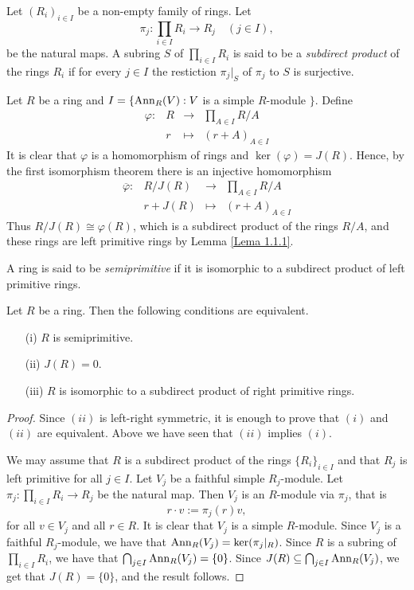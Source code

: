 \begin{definition}
    Let $( R_i) _{i\in I}$ be a non-empty family of rings. Let
    \[
    \pi_j\colon\prod_{i\in I}R_i\rightarrow R_j\quad (j\in I),
    \]
    be the natural maps. A subring $S$ of $\prod_{i\in I}R_i$ is said to be a \emph{subdirect product} 
    of the rings $R_i$ if for every $j\in I$ the restiction $\pi_j|_S$ of $\pi_j$ to $S$ is surjective.
\end{definition}

Let $R$ be a ring and $I=\{ \operatorname{Ann}_R(V) : V$ is a simple $R$-module $\}$. Define
\[
\begin{array}{cccc}\varphi\colon &R&\rightarrow &\prod_{A\in I}R/A\\
&r&\mapsto &(r+A)_{A\in I}\end{array}
\]
It is clear that $\varphi$ is a homomorphism of rings and $\ker(\varphi
)=J(R)$. Hence, by the first isomorphism theorem there is an injective homomorphism
\[
\begin{array}{cccc}\overline{\varphi}\colon &R/J(R)&\rightarrow &\prod_{A\in I}R/A\\
&r+J(R)&\mapsto &(r+A)_{A\in I}\end{array}
\]
Thus $R/J(R)\cong \varphi (R)$, which is a subdirect product of the rings $R/A$, and these rings are left primitive rings by Lemma \ref{Lema 1.1.1}. 

\begin{definition}
A ring is said to be \emph{semiprimitive} if it is isomorphic to a subdirect product of left primitive rings.
\end{definition}

\begin{proposition}\label{Prop1.3.2}
Let $R$ be a ring. Then the following conditions are equivalent.
\begin{itemize}\item[(i)] $R$ is semiprimitive.
\item[(ii)] $J(R)=0$.
\item[(iii)] $R$ is isomorphic to a subdirect product of right primitive rings.
\end{itemize}
\end{proposition}

\begin{proof}
Since $(ii)$ is left-right symmetric, it is enough to prove that  $(i)$ and
$(ii)$ are equivalent. Above we have seen that $(ii)$ implies $(i)$. 

We may assume that $R$ is a subdirect product of the rings $\{ R_i\} _{i\in I}$
and that $R_j$ is left primitive for all $j\in I$. Let $V_j$ be a faithful simple $R_j$-module. 
Let $\pi _j\colon\prod_{i\in I}R_i\rightarrow R_j$ be the natural map. Then $V_j$ is an $R$-module via $\pi _j$,
that is
$$r\cdot v:=\pi_j(r)v,$$
for all $v\in V_j$ and all $r\in R$.
It is clear that $V_j$ is a simple $R$-module. Since $V_j$ is a faithful $R_j$-module, we have that
$\operatorname{Ann}_R(V_j)=\ker(\pi_j |_R)$. Since $R$ is a subring of $\prod_{i\in I}R_i$, we have that $\bigcap_{j\in I}\operatorname{Ann}_R(V_j)=\{0\}$.
Since $J(R)\subseteq \bigcap_{j\in I}\operatorname{Ann}_R(V_j)$, we get that $J(R)=\{0\}$, and the result follows.
\end{proof}

